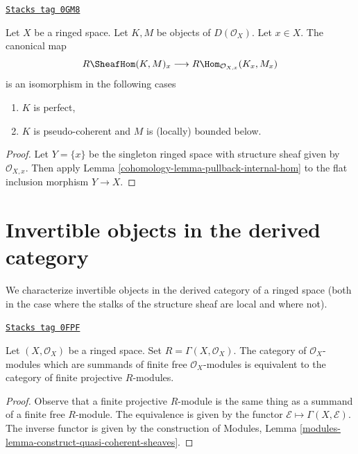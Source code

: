 \begin{lemma}
\label{cohomology-lemma-stalk-internal-hom}
\href{https://stacks.math.columbia.edu/tag/0GM8}{\texttt{Stacks tag 0GM8}}

Let $X$ be a ringed space. Let $K, M$ be objects of $D(\mathcal{O}_X)$.
Let $x \in X$. The canonical map
$$
R\SheafHom(K, M)_x \longrightarrow
R\Hom_{\mathcal{O}_{X, x}}(K_x, M_x)
$$
is an isomorphism in the following cases
\begin{enumerate}
\item $K$ is perfect,
\item $K$ is pseudo-coherent and $M$ is (locally) bounded below.
\end{enumerate}
\end{lemma}

\begin{proof}

Let $Y = \{x\}$ be the singleton ringed space with structure sheaf
given by $\mathcal{O}_{X, x}$. Then apply
Lemma \ref{cohomology-lemma-pullback-internal-hom}
to the flat inclusion morphism $Y \to X$.
\end{proof}

\section{Invertible objects in the derived category}
\label{cohomology-section-invertible-D-or-R}
We characterize invertible objects in the derived category of
a ringed space (both in the case where the stalks of the
structure sheaf are local and where not).

\begin{lemma}
\label{cohomology-lemma-category-summands-finite-free}
\href{https://stacks.math.columbia.edu/tag/0FPF}{\texttt{Stacks tag 0FPF}}

Let $(X, \mathcal{O}_X)$ be a ringed space.
Set $R = \Gamma(X, \mathcal{O}_X)$. The category of
$\mathcal{O}_X$-modules which are summands of finite free
$\mathcal{O}_X$-modules is equivalent to the category of
finite projective $R$-modules.
\end{lemma}

\begin{proof}
Observe that a finite projective $R$-module is the same thing
as a summand of a finite free $R$-module.
The equivalence is given by the functor $\mathcal{E} \mapsto
\Gamma(X, \mathcal{E})$. The inverse functor is given by the construction of
Modules, Lemma \ref{modules-lemma-construct-quasi-coherent-sheaves}.
\end{proof}

